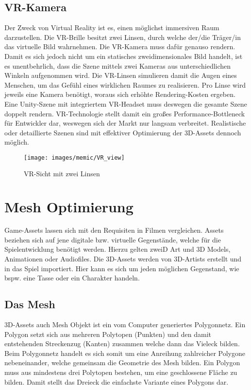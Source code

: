 \subsection{VR-Kamera}

Der Zweck von Virtual Reality ist es, einen möglichst immersiven Raum darzustellen. Die VR-Brille besitzt zwei Linsen, durch welche der/die Träger/in das virtuelle Bild wahrnehmen. Die VR-Kamera muss dafür genauso rendern. Damit es sich jedoch nicht um ein statisches zweidimensionales Bild handelt, ist es unentbehrlich, dass die Szene mittels zwei Kameras aus unterschiedlichen Winkeln aufgenommen wird. Die VR-Linsen simulieren damit die Augen eines Menschen, um das Gefühl eines wirklichen Raumes zu realisieren. Pro Linse wird jeweils eine Kamera benötigt, woraus sich erhöhte Rendering-Kosten ergeben. Eine Unity-Szene mit integriertem VR-Headset muss deswegen die gesamte Szene doppelt rendern. VR-Technologie stellt damit ein großes Performance-Bottleneck für Entwickler dar, weswegen sich der Markt nur langsam verbreitet. Realistische oder detaillierte Szenen sind mit effektiver Optimierung der 3D-Assets dennoch möglich.
\begin{figure}[H]
	\centering
	\texttt{[image: images/memic/VR\_view]}
	\caption{VR-Sicht mit zwei Linsen}
\end{figure}
\cite{_vrview}

\section{Mesh Optimierung}

Game-Assets lassen sich mit den Requisiten in Filmen vergleichen. Assets beziehen sich auf jene digitale bzw. virtuelle Gegenstände, welche für die Spielentwicklung benötigt werden. Hierzu gelten zweiD Art und 3D Models, Animationen oder Audiofiles. Die 3D-Assets werden von 3D-Artists erstellt und in das Spiel importiert. Hier kann es sich um jeden möglichen Gegenstand, wie bspw. eine Tasse oder ein Charakter handeln.\cite{_unity_game_optimization}

\subsection{Das Mesh}

3D-Assets auch Mesh Objekt ist ein vom Computer generiertes Polygonnetz. Ein Polygon setzt sich aus mehreren Polytopen (Punkten) und den damit entstehenden Streckenzug (Kanten) zusammen welche dann das Vieleck bilden. Beim Polygonnetz handelt es sich somit um eine Anreihung zahlreicher Polygone nebeneinander, welche gemeinsam die Geometrie des Mesh bilden. Ein Polygon muss aus mindestens drei Polytopen bestehen, um eine geschlossene Fläche zu bilden. Damit stellt das Dreieck die einfachste Variante eines Polygons dar.\cite{_the_essential_guide_to_3D}


